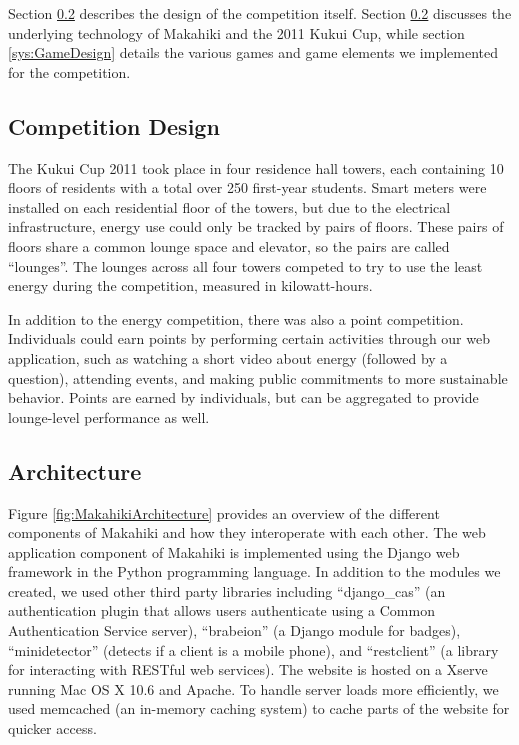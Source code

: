 \documentclass{acm_proc_article-sp}
\begin{document}
Section \ref{sys:Architecture} describes the design of the competition itself. Section \ref{sys:Architecture} discusses the underlying technology of Makahiki and the 2011 Kukui Cup, while section \ref{sys:GameDesign} details the various games and game elements we implemented for the competition.

\subsection{Competition Design}
\label{sys:competition}

The Kukui Cup 2011 took place in four residence hall towers, each containing 10 floors of residents with a total over 250 first-year students. Smart meters were installed on each residential floor of the towers, but due to the electrical infrastructure, energy use could only be tracked by pairs of floors. These pairs of floors share a common lounge space and elevator, so the pairs are called ``lounges''. The lounges across all four towers competed to try to use the least energy during the competition, measured in kilowatt-hours.

In addition to the energy competition, there was also a point competition. Individuals could earn points by performing certain activities through our web application, such as watching a short video about energy (followed by a question), attending events, and making public commitments to more sustainable behavior. Points are earned by individuals, but can be aggregated to provide lounge-level performance as well.

\subsection{Architecture}
\label{sys:Architecture}

Figure \ref{fig:MakahikiArchitecture} provides an overview of the different components of Makahiki and how they interoperate with each other. The web application component of Makahiki is implemented using the Django web framework in the Python programming language. In addition to the modules we created, we used other third party libraries including ``django\_cas'' (an authentication plugin that allows users authenticate using a Common Authentication Service server), ``brabeion'' (a Django module for badges), ``minidetector'' (detects if a client is a mobile phone), and ``restclient'' (a library for interacting with RESTful web services). The website is hosted on a Xserve running Mac OS X 10.6 and Apache. To handle server loads more efficiently, we used memcached (an in-memory caching system) to cache parts of the website for quicker access.
\end{document}
